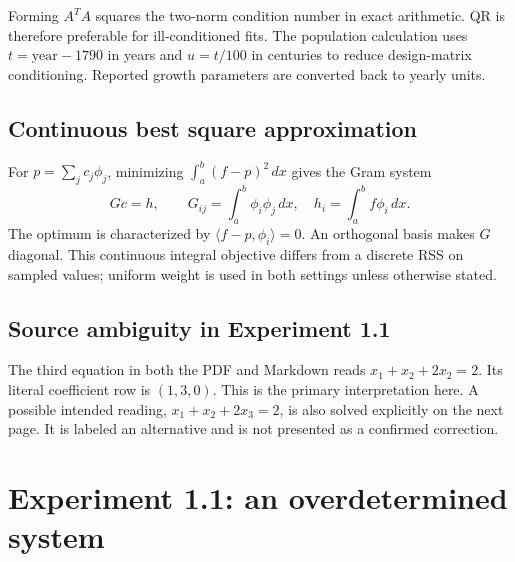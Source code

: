 \documentclass[11pt,a4paper]{article}
\begin{document}
Forming $A^TA$ squares the two-norm condition number in exact arithmetic. QR is therefore preferable for ill-conditioned fits. The population calculation uses $t=\text{year}-1790$ in years and $u=t/100$ in centuries to reduce design-matrix conditioning. Reported growth parameters are converted back to yearly units.

\subsection{Continuous best square approximation}
For $p=\sum_jc_j\phi_j$, minimizing $\int_a^b(f-p)^2\,dx$ gives the Gram system
\[
Gc=h,\qquad G_{ij}=\int_a^b\phi_i\phi_j\,dx,\quad
h_i=\int_a^bf\phi_i\,dx.
\]
The optimum is characterized by $\langle f-p,\phi_i\rangle=0$. An orthogonal basis makes $G$ diagonal. This continuous integral objective differs from a discrete RSS on sampled values; uniform weight is used in both settings unless otherwise stated.

\subsection{Source ambiguity in Experiment 1.1}
The third equation in both the PDF and Markdown reads $x_1+x_2+2x_2=2$. Its literal coefficient row is $(1,3,0)$. This is the primary interpretation here. A possible intended reading, $x_1+x_2+2x_3=2$, is also solved explicitly on the next page. It is labeled an alternative and is not presented as a confirmed correction.

\clearpage
\section{Experiment 1.1: an overdetermined system}
\end{document}
